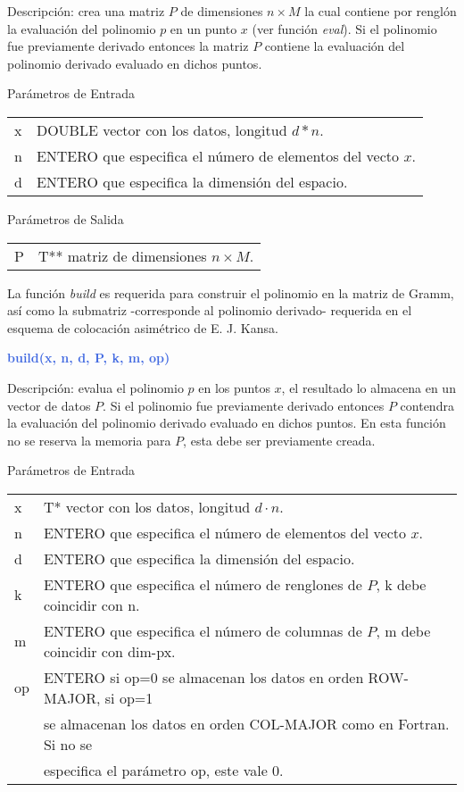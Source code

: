 \documentclass[a4paper,11pt]{article}
\begin{document}
{{{{\noindent
Descripci\'on: crea una matriz $P$ de dimensiones $n \times M$ la cual contiene por rengl\'on
la evaluaci\'on del polinomio $p$ en un punto $x$ (ver funci\'on \textit{eval}).
Si el polinomio fue previamente derivado entonces la matriz $P$ contiene la evaluaci\'on del
polinomio derivado evaluado en dichos puntos.

\noindent
Par\'ametros de Entrada

\begin{tabular}{ll}
    x  &  DOUBLE vector con los datos, longitud $d*n$. \\
    n  &  ENTERO que especifica el n\'umero de elementos del vecto $x$. \\
    d  &  ENTERO que especifica la dimensi\'on del espacio.
\end{tabular}


\noindent
Par\'ametros de Salida

\begin{tabular}{ll}
    P  &  T** matriz de dimensiones $n \times M$.
\end{tabular}

\noindent
La funci\'on \textit{build} es requerida para construir el polinomio en la matriz de Gramm, as\'i como
la submatriz -corresponde al polinomio derivado- requerida en el esquema de colocaci\'on asim\'etrico de E. J. Kansa.


\vspace{7mm}
\noindent
{\textcolor{RoyalBlue}{ \textbf{ build(x, n, d, P, k, m, op)  } }
	
\noindent
Descripci\'on: evalua el polinomio $p$ en los puntos $x$, el resultado lo
almacena en un vector de datos $P$.
Si el polinomio fue previamente derivado entonces  $P$ contendra la evaluaci\'on del
polinomio derivado evaluado en dichos puntos.
En esta funci\'on no se reserva la memoria para $P$, esta debe ser previamente creada. 

\noindent
Par\'ametros de Entrada

\begin{tabular}{ll}
    x  &  T* vector con los datos, longitud $d \cdot n$. \\
    n  &  ENTERO que especifica el n\'umero de elementos del vecto $x$. \\
    d  &  ENTERO que especifica la dimensi\'on del espacio. \\
    k  &  ENTERO que especifica el n\'umero de renglones de $P$, k debe coincidir con n.\\ 
    m  &  ENTERO que especifica el n\'umero de columnas de $P$, m debe coincidir  con dim-px.  \\
    op &  ENTERO si op=0 se almacenan los datos en orden ROW-MAJOR, si op=1  \\    
       &   se almacenan los datos en orden COL-MAJOR como en Fortran. Si no se \\
       &  especifica el par\'ametro op, este vale 0.
\end{tabular}

}}}}}
\end{document}
